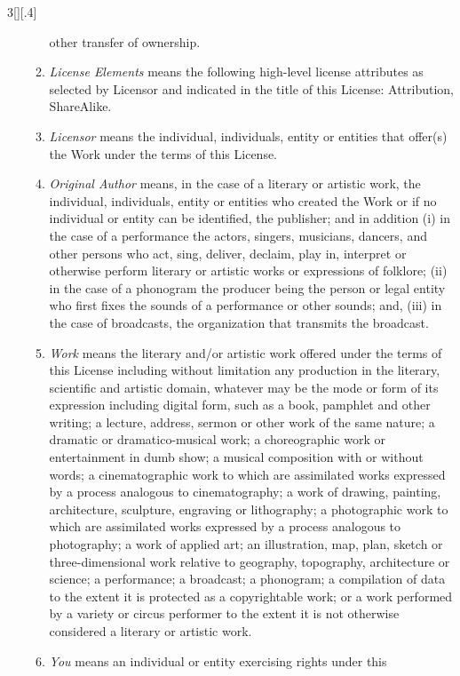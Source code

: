 \documentclass[8pt,a4paper]{article}
\begin{document}
\begin{multicols}{3}[][.4\paperwidth]
\begin{enumerate}
\begin{enumerate}
        other transfer of ownership.
  \item \emph{License Elements} means the following high-level license attributes
        as selected by Licensor and indicated in the title of this License:
        Attribution, ShareAlike.
  \item \emph{Licensor} means the individual, individuals, entity or entities
        that offer(s) the Work under the terms of this License.
  \item \emph{Original Author} means, in the case of a literary or artistic work,
        the individual, individuals, entity or entities who created the Work
        or if no individual or entity can be identified, the publisher; and in
        addition (i) in the case of a performance the actors, singers,
        musicians, dancers, and other persons who act, sing, deliver, declaim,
        play in, interpret or otherwise perform literary or artistic works or
        expressions of folklore; (ii) in the case of a phonogram the producer
        being the person or legal entity who first fixes the sounds of a
        performance or other sounds; and, (iii) in the case of broadcasts, the
        organization that transmits the broadcast.
  \item \emph{Work} means the literary and/or artistic work offered under the
        terms of this License including without limitation any production in the
        literary, scientific and artistic domain, whatever may be the mode or
        form of its expression including digital form, such as a book,
        pamphlet and other writing; a lecture, address, sermon or other work
        of the same nature; a dramatic or dramatico-musical work; a
        choreographic work or entertainment in dumb show; a musical
        composition with or without words; a cinematographic work to which are
        assimilated works expressed by a process analogous to cinematography;
        a work of drawing, painting, architecture, sculpture, engraving or
        lithography; a photographic work to which are assimilated works
        expressed by a process analogous to photography; a work of applied
        art; an illustration, map, plan, sketch or three-dimensional work
        relative to geography, topography, architecture or science; a
        performance; a broadcast; a phonogram; a compilation of data to the
        extent it is protected as a copyrightable work; or a work performed by
        a variety or circus performer to the extent it is not otherwise
        considered a literary or artistic work.
  \item \emph{You} means an individual or entity exercising rights under this

\end{enumerate}
\end{enumerate}
\end{multicols}
\end{document}

